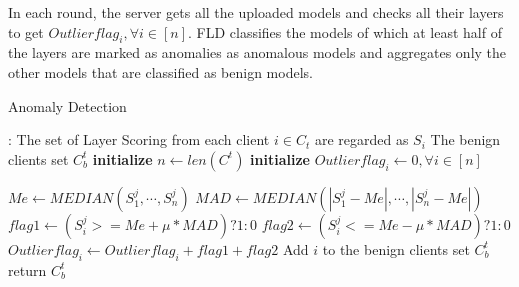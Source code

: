 In each round, the server gets all the uploaded models and checks all their layers to get $ Outlierflag_{i},\forall i\in \left [ n \right ] $. FLD classifies the models of which at least half of the layers are marked as anomalies as anomalous models and aggregates only the other models that are classified as benign models. 
\begin{algorithm}
    \caption{Anomaly Detection}\label{algorithm3}
    \begin{algorithmic} [1]
        \algrenewcommand{}
        \Require: The set of Layer Scoring from each client $ i\in C_{t}$ are regarded as $S_{i}$
        \algrenewcommand{} 
        \Require  The benign clients set $C_b^t$
        \State \textbf{initialize }  $n\gets len\left ( C^{t} \right ) $
        \State \textbf{initialize }  $Outlierflag_{i}  \gets 0, \forall i\in \left [ n \right ] $
        
         
        \State  $ Me \gets  MEDIAN\left ( S_{1}^{j} ,\cdots,S_{n}^{j} \right ) $
        \State  $MAD\gets MEDIAN(\left | S_{1}^{j}-Me \right |, \cdots, \left | S_{n}^{j}-Me \right |)$
        \State $ flag1\gets \left ( S_{i}^{j} >= Me + \mu *MAD\right  ) ?1:0$
        \State $ flag2\gets \left ( S_{i}^{j} <= Me - \mu *MAD\right  ) ?1:0$
        \State $ Outlierflag_{i}\gets Outlierflag_{i}+flag1+flag2$
        \EndFor
        \EndFor
        \State Add $i$ to the benign clients set $C_b^t$
        \EndIf
        \EndFor
        \State return $C_b^t$
    \end{algorithmic}
\end{algorithm}


